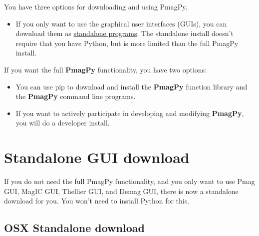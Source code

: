 \documentclass[11pt]{book}
\begin{document}
{%
You have three options for downloading and using PmagPy.

\begin{itemize}
\item If you only want to use the graphical user interfaces (GUIs), you can download them as  \href{#standalone}{standalone programs}.  The standalone install doesn't require that you have Python, but is more limited than the full PmagPy install.

\end{itemize}

If you want the full {\bf PmagPy} functionality, you have two options:

\begin{itemize}

  \item You can use pip to download and install the {\bf PmagPy} function library and the {\bf PmagPy} command line programs.

  \item If you want to actively participate in developing and modifying {\bf PmagPy}, you will do a developer install.
\end{itemize}


\section{Standalone GUI download}

If you do not need the full PmagPy functionality, and you only want to use Pmag GUI, MagIC GUI, Thellier GUI, and Demag GUI, there is now a standalone download for you.  You won't need to install Python for this.


\subsection{OSX Standalone download}

}
\end{document}
